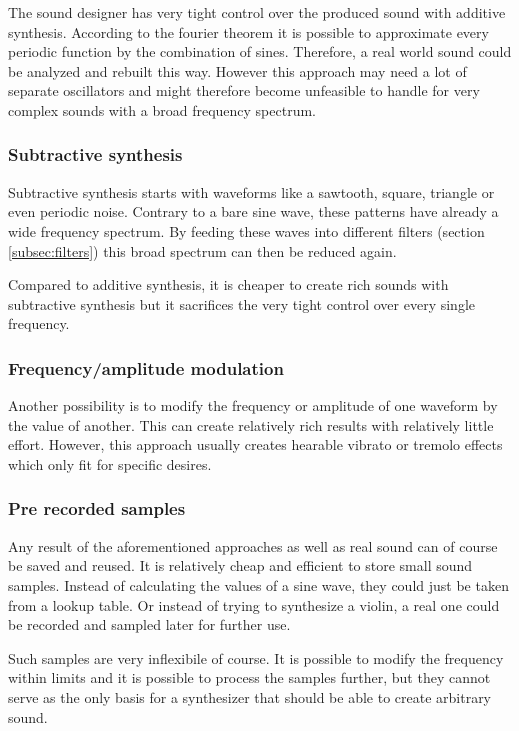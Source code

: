 				The sound designer has very tight control over the produced sound with additive synthesis.
				According to the fourier theorem it is possible to approximate every periodic function by the combination of sines. 
				Therefore, a real world sound could be analyzed and rebuilt this way.
				However this approach may need a lot of separate oscillators and might therefore become unfeasible to handle for very complex sounds with a broad frequency spectrum.
			\subsubsection{Subtractive synthesis}
				Subtractive synthesis starts with waveforms like a sawtooth, square, triangle or even periodic noise.
				Contrary to a bare sine wave, these patterns have already a wide frequency spectrum. 
				By feeding these waves into different filters (section \ref{subsec:filters}) this broad spectrum can then be reduced again. 
				
				Compared to additive synthesis, it is cheaper to create rich sounds with subtractive synthesis but it sacrifices the very tight control over every single frequency.
			\subsubsection{Frequency/amplitude modulation}
				Another possibility is to modify the frequency or amplitude of one waveform by the value of another.
				This can create relatively rich results with relatively little effort.
				However, this approach usually creates hearable vibrato or tremolo effects which only fit for specific desires.
			\subsubsection{Pre recorded samples}
				Any result of the aforementioned approaches as well as real sound can of course be saved and reused.
				It is relatively cheap and efficient to store small sound samples. 
				Instead of calculating the values of a sine wave, they could just be taken from a lookup table.
				Or instead of trying to synthesize a violin, a real one could be recorded and sampled later for further use.
				
				Such samples are very inflexibile of course.
				It is possible to modify the frequency within limits and it is possible to	process the samples further, but they cannot serve as the only basis for a synthesizer that should be able to create arbitrary sound.			
